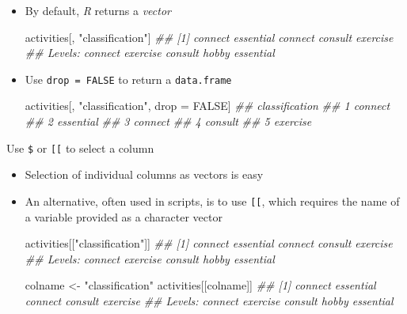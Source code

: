 \documentclass[
]{book}
\newenvironment{Shaded}{\begin{snugshade}}{\end{snugshade}}
\newcommand{\CommentTok}[1]{\textcolor[rgb]{0.56,0.35,0.01}{\textit{#1}}}
\newcommand{\NormalTok}[1]{#1}
\newcommand{\OperatorTok}[1]{\textcolor[rgb]{0.81,0.36,0.00}{\textbf{#1}}}
\newcommand{\OtherTok}[1]{\textcolor[rgb]{0.56,0.35,0.01}{#1}}
\newcommand{\StringTok}[1]{\textcolor[rgb]{0.31,0.60,0.02}{#1}}
\begin{document}
\begin{itemize}
  \begin{itemize}
  \item
    By default, \emph{R} returns a \emph{vector}

\begin{Shaded}
\begin{Highlighting}[]
\NormalTok{activities[, }\StringTok{"classification"}\NormalTok{]}
\CommentTok{## [1] connect   essential connect   consult   exercise }
\CommentTok{## Levels: connect exercise consult hobby essential}
\end{Highlighting}
\end{Shaded}
  \item
    Use \texttt{drop\ =\ FALSE} to return a \texttt{data.frame}

\begin{Shaded}
\begin{Highlighting}[]
\NormalTok{activities[, }\StringTok{"classification"}\NormalTok{, drop =}\StringTok{ }\OtherTok{FALSE}\NormalTok{]}
\CommentTok{##   classification}
\CommentTok{## 1        connect}
\CommentTok{## 2      essential}
\CommentTok{## 3        connect}
\CommentTok{## 4        consult}
\CommentTok{## 5       exercise}
\end{Highlighting}
\end{Shaded}
  \end{itemize}
\end{itemize}

Use \texttt{\$} or \texttt{{[}{[}} to select a column

\begin{itemize}
\item
  Selection of individual columns as vectors is easy

\begin{Shaded}
\end{Shaded}
\item
  An alternative, often used in scripts, is to use \texttt{{[}{[}}, which requires the name of a variable provided as a character vector

\begin{Shaded}
\begin{Highlighting}[]
\NormalTok{activities[[}\StringTok{"classification"}\NormalTok{]]}
\CommentTok{## [1] connect   essential connect   consult   exercise }
\CommentTok{## Levels: connect exercise consult hobby essential}

\NormalTok{colname <-}\StringTok{ "classification"}
\NormalTok{activities[[colname]]}
\CommentTok{## [1] connect   essential connect   consult   exercise }
\CommentTok{## Levels: connect exercise consult hobby essential}
\end{Highlighting}
\end{Shaded}
\end{itemize}
\end{document}
